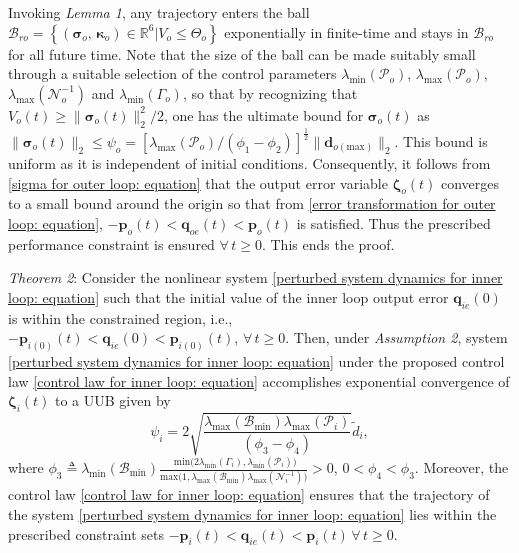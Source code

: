 \documentclass[lettersize,journal]{IEEEtran}
\begin{document}
Invoking \textit{Lemma 1}, any trajectory enters the ball $\mathcal{B}_{ro} = \left \{ \left ( \boldsymbol{\sigma}_o, \, \boldsymbol{\kappa}_o \right ) \in \mathbb{R}^6 | V_o \leq \Theta_o \right\}$ exponentially in finite-time and stays in $\mathcal{B}_{ro}$ for all future time. Note that the size of the ball can be made suitably small through a suitable selection of the control parameters $\lambda_{\text{min}}(\mathcal{P}_o)$, $\lambda_{\text{max}}(\mathcal{P}_o)$, $\lambda_{\text{max}}(\mathcal{N}_o^{-1}) $ and $\lambda_{\text{min}}(\Gamma_o)$, so that by recognizing that $V_o(t) \geq \lVert \boldsymbol{\sigma}_o(t) \rVert_2^2/2$, one has the ultimate bound for $\boldsymbol{\sigma}_o(t)$ as $\lVert \boldsymbol{\sigma}_o(t) \rVert_2 \leq \psi_o {=} \left[\lambda_{\text{max}}(\mathcal{P}_o)/\left(\phi_1 - \phi_2\right)\right]^{\frac{1}{2}} \lVert \boldsymbol{d}_{o(\text{max})} \rVert_2$. This bound is uniform as it is independent of initial conditions. 
Consequently, it follows from \eqref{sigma for outer loop: equation} that the output error variable $\boldsymbol{\zeta}_o(t)$ converges to a small bound around the origin so that from \eqref{error transformation for outer loop: equation}, $- \boldsymbol{p}_{o}(t) < \boldsymbol{q}_{oe}(t) < \boldsymbol{p}_{o}(t)$ is satisfied. Thus the prescribed performance constraint is ensured $\forall \, t \geq 0$. This ends the proof.

\textit{Theorem 2}:
Consider the nonlinear system \eqref{perturbed system dynamics for inner loop: equation} such that the initial value of the inner loop output error $\boldsymbol{q}_{ie}(0)$ is within the constrained region, i.e., $- \boldsymbol{p}_{i (0)}(t) < \boldsymbol{q}_{ie}(0) < \boldsymbol{p}_{i (0)}(t), \, \forall \, t \geq 0$. Then, under \textit{Assumption 2}, system \eqref{perturbed system dynamics for inner loop: equation} under the proposed control law \eqref{control law for inner loop: equation} accomplishes exponential convergence of $\boldsymbol{\zeta}_i(t)$ to a UUB given by
\begin{equation}
    \psi_i = 2 \sqrt{\frac{\lambda_{\text{max}}(\mathcal{B}_{\text{min}})\lambda_{\text{max}}(\mathcal{P}_i)}{\left(\phi_3 - \phi_4\right)}} \tilde{d}_{i},
\end{equation}
where $\phi_3 \triangleq \lambda_{\text{min}}\left(\mathcal{B}_{\text{min}} \right) \frac{\text{ min}\big(2 \lambda_{\text{min}}\left(\Gamma_i \right),\lambda_{\text{min}}\left(\mathcal{P}_i \right)\big)}{\text{max}\big(1,\lambda_{\text{max}}\left(\mathcal{B}_{\text{min}} \right) \lambda_{\text{max}}\left(\mathcal{N}_i^{-1} \right)\big)}>0$, $0<\phi_4<\phi_3$.
Moreover, the control law \eqref{control law for inner loop: equation} ensures that the trajectory of the system \eqref{perturbed system dynamics for inner loop: equation} lies within the prescribed constraint sets $- \boldsymbol{p}_{i}(t) < \boldsymbol{q}_{ie}(t) < \boldsymbol{p}_{i}(t) \, \forall \, t \geq 0$.
\end{document}
